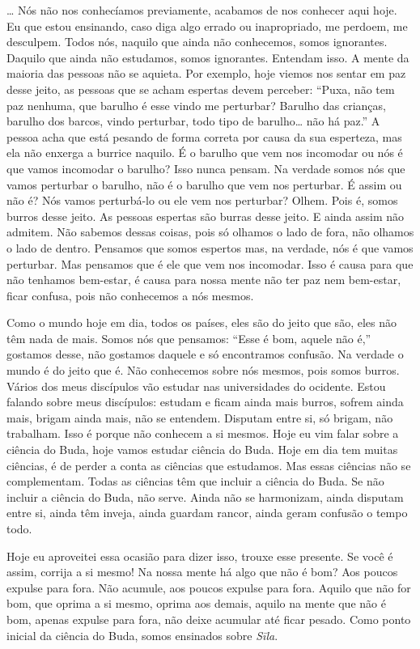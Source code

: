 \ldots{} Nós não nos conhecíamos previamente, acabamos de nos conhecer
aqui hoje. Eu que estou ensinando, caso diga algo errado ou
inapropriado, me perdoem, me desculpem. Todos nós, naquilo que ainda
não conhecemos, somos ignorantes. Daquilo que ainda não estudamos,
somos ignorantes. Entendam isso. A mente da maioria das pessoas não se
aquieta. Por exemplo, hoje viemos nos sentar em paz desse jeito, as
pessoas que se acham espertas devem perceber: “Puxa, não tem paz
nenhuma, que barulho é esse vindo me perturbar? Barulho das crianças,
barulho dos barcos, vindo perturbar, todo tipo de barulho\ldots{} não há paz.”
A pessoa acha que está pesando de forma correta por causa da sua
esperteza, mas ela não enxerga a burrice naquilo. É o barulho que vem
nos incomodar ou nós é que vamos incomodar o barulho? Isso nunca
pensam. Na verdade somos nós que vamos perturbar o barulho, não é o
barulho que vem nos perturbar. É assim ou não é? Nós vamos perturbá-lo
ou ele vem nos perturbar? Olhem. Pois é, somos burros desse jeito. As
pessoas espertas são burras desse jeito. E ainda assim não admitem. Não
sabemos dessas coisas, pois só olhamos o lado de fora, não olhamos o
lado de dentro. Pensamos que somos espertos mas, na verdade, nós é que
vamos perturbar. Mas pensamos que é ele que vem nos incomodar. Isso é
causa para que não tenhamos bem-estar, é causa para nossa mente não ter
paz nem bem-estar, ficar confusa, pois não conhecemos a nós mesmos.

Como o mundo hoje em dia, todos os países, eles são do jeito que
são, eles não têm nada de mais. Somos nós que pensamos: “Esse é bom,
aquele não é,” gostamos desse, não gostamos daquele e só encontramos
confusão. Na verdade o mundo é do jeito que é. Não conhecemos sobre nós
mesmos, pois somos burros. Vários dos meus discípulos vão estudar nas
universidades do ocidente. Estou falando sobre meus discípulos: estudam
e ficam ainda mais burros, sofrem ainda mais, brigam ainda mais, não se
entendem. Disputam entre si, só brigam, não trabalham. Isso é porque
não conhecem a si mesmos. Hoje eu vim falar sobre a ciência do Buda,
hoje vamos estudar ciência do Buda. Hoje em dia tem muitas ciências, é
de perder a conta as ciências que estudamos. Mas essas ciências não se
complementam. Todas as ciências têm que incluir a ciência do Buda. Se
não incluir a ciência do Buda, não serve. Ainda não se harmonizam,
ainda disputam entre si, ainda têm inveja, ainda guardam rancor, ainda
geram confusão o tempo todo.

Hoje eu aproveitei essa ocasião para dizer isso, trouxe esse
presente. Se você é assim, corrija a si mesmo! Na nossa mente há algo
que não é bom? Aos poucos expulse para fora. Não acumule, aos poucos
expulse para fora. Aquilo que não for bom, que oprima a si mesmo,
oprima aos demais, aquilo na mente que não é bom, apenas expulse para
fora, não deixe acumular até ficar pesado. Como ponto inicial da
ciência do Buda, somos ensinados sobre \emph{Sīla}. 

